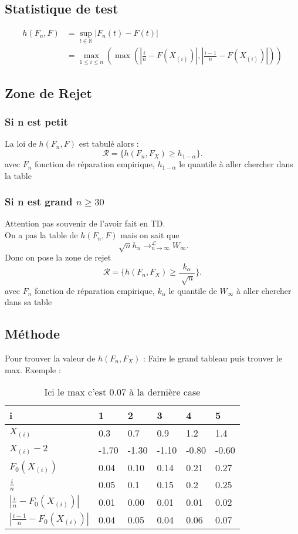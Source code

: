 \documentclass{article}
\theoremstyle{plain}%
\theoremstyle{definition}
\theoremstyle{remark}
\begin{document}
\subsection*{Statistique de test} 
\begin{align*}
    h(F_n, F) &= \sup _{t \in \mathbb{R}} \left| F_n(t) - F(t) \right| \\
        &= \max _{1 \leq i \leq n} ( \max ( \left| \frac{i}{n} - F(X_{(i)}) \right| , \left| \frac{i-1}{n}- F(X_{(i)}) \right|  ))
\end{align*}    

\subsection*{Zone de Rejet}
\subsubsection*{Si n est petit}
La loi de $ h(F_n, F) $ est tabulé alors :
\[
    \mathcal{R} = \{h(F_n, F_X) \geq h_{1-\alpha }\}
.\]
avec $ F_n $ fonction de réparation empirique, $ h_{1 -\alpha } $ le quantile à aller chercher dans la table 

\subsubsection*{Si n est grand $ n \geq 30 $ }
Attention pas souvenir de l'avoir fait en TD. \\
On a pas la table de $ h(F_n, F) $ mais on sait que 
\[
    \sqrt[]{n}h_n \to ^{\mathcal{L}}_{n \to \infty } W_{\infty }
.\]
Donc on pose la zone de rejet 
\[
    \mathcal{R} = \{h(F_n, F_X) \geq \frac{k_\alpha }{\sqrt[]{n}} \}
.\]
avec $ F_n $ fonction de réparation empirique, $ k_{\alpha } $ le quantile de $ W_\infty  $ à aller chercher dans sa table 

\subsection*{Méthode}
Pour trouver la valeur de $ h(F_n, F_X) $ : Faire le grand tableau puis trouver le max. Exemple : 
\begin{table}[!h]
    \centering
    \begin{tabular}{|l|l|l|l|l|l|}
    \hline
        i & 1 & 2 & 3 & 4 & 5 \\ \hline
        $X_{(i)}$ & 0.3 & 0.7 & 0.9 & 1.2 & 1.4 \\ \hline
        $X_{(i)} - 2$ & -1.70 & -1.30 & -1.10 & -0.80 & -0.60 \\ \hline
        $F_0(X_{(i)})$ & 0.04 & 0.10 & 0.14 & 0.21 & 0.27 \\ \hline
        $\frac{i}{n}$ & 0.05 & 0.1 & 0.15 & 0.2 & 0.25 \\ \hline
        $|\frac{i}{n} - F_0(X_{(i)})|$ & 0.01 & 0.00 & 0.01 & 0.01 & 0.02 \\ \hline
        $|\frac{i-1}{n} - F_0(X_{(i)})|$ & 0.04 & 0.05 & 0.04 & 0.06 & 0.07 \\ \hline
    \end{tabular}
    \caption{Ici le max c'est $0.07$ à la dernière case}
\end{table}
\end{document}
